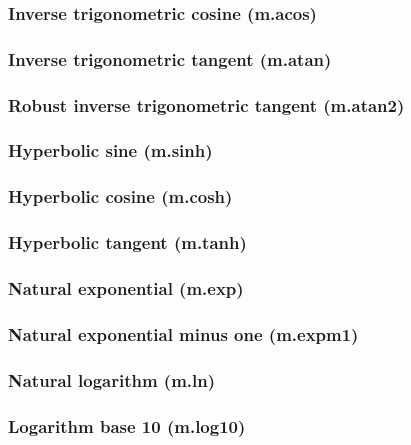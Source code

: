 \documentclass{article}
\theoremstyle{definition}
\begin{document}
\subsubsection{Inverse trigonometric cosine (m.acos)}

\subsubsection{Inverse trigonometric tangent (m.atan)}

\subsubsection{Robust inverse trigonometric tangent (m.atan2)}

\subsubsection{Hyperbolic sine (m.sinh)}

\subsubsection{Hyperbolic cosine (m.cosh)}

\subsubsection{Hyperbolic tangent (m.tanh)}

\subsubsection{Natural exponential (m.exp)}

\subsubsection{Natural exponential minus one (m.expm1)}

\subsubsection{Natural logarithm (m.ln)}

\subsubsection{Logarithm base 10 (m.log10)}
\end{document}
